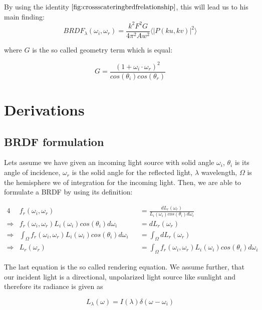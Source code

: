 By using the identity $\ref{fig:crossscateringbrdfrelationship}$, this will lead us to his main finding:
\begin{equation} 
  BRDF_{\lambda}(\omega_i, \omega_r) = \frac{k^2 F^2 G}{4\pi^2 A w^2} \langle \left|P(ku, kv)\right|^2\rangle
\label{eq:mainstam}
\end{equation}

where $G$ is the so called geometry term which is equal: 

\begin{equation}
  G =\frac{(1 + \omega_i \cdot \omega_r)^2}{cos(\theta_i)cos(\theta_r)}
\label{eq:geometricterm}
\end{equation}

\section{Derivations}
\subsection{BRDF formulation}
Lets assume we have given an incoming light source with solid angle $\omega_i$, $\theta{_i}$ is its angle of incidence, $\omega_r$ is the solid angle for the reflected light, $\lambda$ wavelength, $\Omega$ is the hemisphere we of integration for the incoming light. Then, we are able to formulate a BRDF by using its definition:  



\begin{alignat}{4}
& f_r(\omega_i, \omega_r) &&= \frac{dL_r(\omega_r)}{L_i(\omega_i)cos(\theta_i)d\omega_i} \nonumber \\
\Rightarrow{} & f_r(\omega_i, \omega_r) L_i(\omega_i)cos(\theta_i)d\omega_i &&= dL_r(\omega_r) \nonumber \\
\Rightarrow{} & \int_{\Omega}f_r(\omega_i, \omega_r) L_i(\omega_i)cos(\theta_i)d\omega_i &&= \int_{\Omega}dL_r(\omega_r) \nonumber\\
\Rightarrow{} & L_r(\omega_r) &&= \int_{\Omega}f_r(\omega_i, \omega_r) L_i(\omega_i)cos(\theta_i)d\omega_i
\end{alignat}

The last equation is the so called rendering equation.
We assume further, that our incident light is a directional, unpolarized light source like sunlight and therefore its radiance is given as 

\begin{equation}
 L_{\lambda}(\omega)=I(\lambda)\delta(\omega-\omega_i)
\end{equation}

